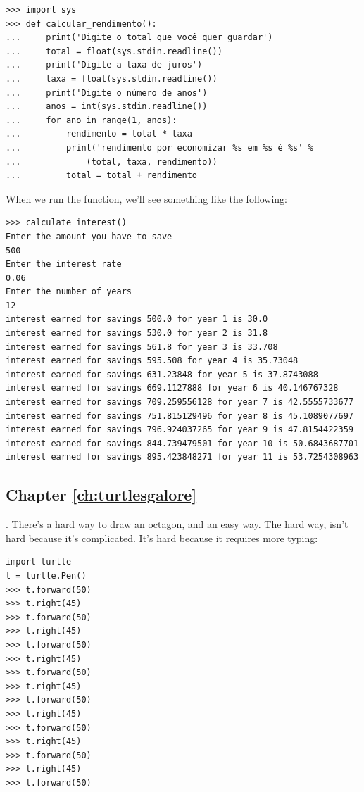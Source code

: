 \begin{listing}
\begin{verbatim}
>>> import sys
>>> def calcular_rendimento():
...     print('Digite o total que você quer guardar')
...     total = float(sys.stdin.readline())
...     print('Digite a taxa de juros')
...     taxa = float(sys.stdin.readline())
...     print('Digite o número de anos')
...     anos = int(sys.stdin.readline())
...     for ano in range(1, anos):
...         rendimento = total * taxa
...         print('rendimento por economizar %s em %s é %s' % 
...             (total, taxa, rendimento))
...         total = total + rendimento
\end{verbatim}
\end{listing}

\noindent
When we run the function, we'll see something like the following:

\begin{listingignore}
\begin{verbatim}
>>> calculate_interest()
Enter the amount you have to save
500
Enter the interest rate
0.06
Enter the number of years
12
interest earned for savings 500.0 for year 1 is 30.0
interest earned for savings 530.0 for year 2 is 31.8
interest earned for savings 561.8 for year 3 is 33.708
interest earned for savings 595.508 for year 4 is 35.73048
interest earned for savings 631.23848 for year 5 is 37.8743088
interest earned for savings 669.1127888 for year 6 is 40.146767328
interest earned for savings 709.259556128 for year 7 is 42.5555733677
interest earned for savings 751.815129496 for year 8 is 45.1089077697
interest earned for savings 796.924037265 for year 9 is 47.8154422359
interest earned for savings 844.739479501 for year 10 is 50.6843687701
interest earned for savings 895.423848271 for year 11 is 53.7254308963
\end{verbatim}
\end{listingignore}

\subsection*{Chapter \ref{ch:turtlesgalore}}

. There's a hard way to draw an octagon, and an easy way.  The hard way, isn't hard because it's complicated.  It's hard because it requires more typing:

\begin{listing}
\begin{verbatim}
import turtle
t = turtle.Pen()
>>> t.forward(50)
>>> t.right(45)
>>> t.forward(50)
>>> t.right(45)
>>> t.forward(50)
>>> t.right(45)
>>> t.forward(50)
>>> t.right(45)
>>> t.forward(50)
>>> t.right(45)
>>> t.forward(50)
>>> t.right(45)
>>> t.forward(50)
>>> t.right(45)
>>> t.forward(50)
\end{verbatim}
\end{listing}

